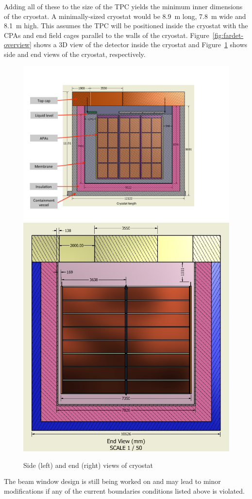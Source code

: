 Adding all of these to the size of the TPC yields the minimum inner dimensions of the cryostat.  A 
minimally-sized cryostat would be 8.9~m long, 7.8~m wide and 8.1~m high.  This assumes the TPC will be 
positioned inside the cryostat with the CPAs and end field cages parallel to the walls of the cryostat. 
Figure~\ref{fig:fardet-overview} shows a 3D view of the detector inside the cryostat and Figure~\ref{fig:cryostat-views} shows side and end views of the cryostat, respectively. 
%
\begin{figure}
\begin{center}
\includegraphics[width=.53\textwidth]{figures/cryostat-side-view} 
\includegraphics[width=.455\textwidth]{figures/cryostat-westend-view}  
\caption[Views of cryostat]{Side (left) and end (right) views of cryostat}
\label{fig:cryostat-views} 
\end{center}
\end{figure}
%
The beam window design is still being worked on and may lead to minor modifications if
any of the current boundaries conditions listed above is violated.
  

